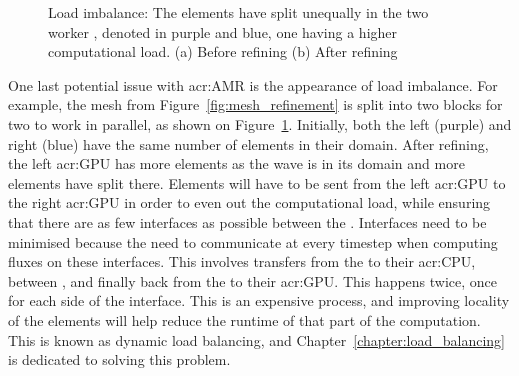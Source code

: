 \begin{figure}[H]
	\centering
	\hfill
	\caption{Load imbalance: The elements have split unequally in the two worker , denoted in purple and blue, one having a higher computational load. (a) Before refining (b) After refining}\label{fig:load_imbalance}
\end{figure}

One last potential issue with \acrshort{acr:AMR} is the appearance of load imbalance. For example,
the mesh from Figure~\ref{fig:mesh_refinement} is split into two blocks for two 
to work in parallel, as shown on Figure~\ref{fig:load_imbalance}. Initially, both the left (purple)
and right (blue)  have the same number of elements in their domain. After
refining, the left \acrshort{acr:GPU} has more elements as the wave is in its domain and more
elements have split there. Elements will have to be sent from the left \acrshort{acr:GPU} to the
right \acrshort{acr:GPU} in order to even out the computational load, while ensuring that there are
as few interfaces as possible between the . Interfaces need to be minimised
because the  need to communicate at every timestep when computing fluxes on
these interfaces. This involves transfers from the  to their \acrshort{acr:CPU},
between , and finally back from the  to their
\acrshort{acr:GPU}. This happens twice, once for each side of the interface. This is an expensive
process, and improving locality of the elements will help reduce the runtime of that part of the
computation. This is known as dynamic load balancing, and Chapter~\ref{chapter:load_balancing} is
dedicated to solving this problem.

